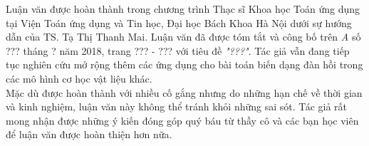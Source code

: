 Luận văn được hoàn thành trong chương trình Thạc sĩ Khoa học Toán ứng dụng tại Viện Toán ứng dụng và Tin học, Đại học Bách Khoa Hà Nội dưới sự hướng dẫn của TS. Tạ Thị Thanh Mai. Luận văn đã được tóm tắt và công bố trên {\em A} số ??? tháng ? năm 2018, trang ??? - ??? với tiêu đề \textit{"???"}. Tác giả vẫn đang tiếp tục nghiên cứu mở rộng thêm các ứng dụng cho bài toán biến dạng đàn hồi trong các mô hình cơ học vật liệu khác.\\[-0.5cm]

Mặc dù được hoàn thành với nhiều cố gắng nhưng do những hạn chế về thời gian và kinh nghiệm, luận văn này không thể tránh khỏi những sai sót. Tác giả rất mong nhận được những ý kiến đóng góp quý báu từ thầy cô và các bạn học viên để luận văn được hoàn thiện hơn nữa.